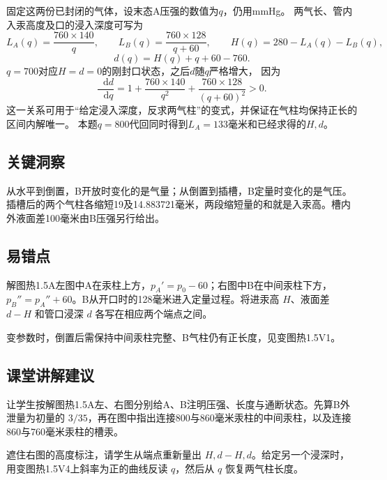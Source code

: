 \documentclass[UTF8,fontset=fandol,a4paper,11pt]{ctexart}
\newcommand{\dd}{\mathop{}\!\mathrm{d}}
\begin{document}
固定这两份已封闭的气体，设末态A压强的数值为$q$，仍用mmHg。
两气长、管内入汞高度及口的浸入深度可写为
\[
L_A(q)=\frac{760\times140}{q},\qquad
L_B(q)=\frac{760\times128}{q+60},\qquad
H(q)=280-L_A(q)-L_B(q),
\]
\[
d(q)=H(q)+q+60-760.
\]
$q=700$对应$H=d=0$的刚封口状态，之后$d$随$q$严格增大，
因为
\[
\frac{\dd d}{\dd q}
=1+\frac{760\times140}{q^2}
+\frac{760\times128}{(q+60)^2}>0.
\]
这一关系可用于“给定浸入深度，反求两气柱”的变式，并保证在气柱均保持正长的区间内解唯一。
本题$q=800$代回同时得到$L_A=133$毫米和已经求得的$H,d$。




\subsection*{关键洞察}

从水平到倒置，B开放时变化的是气量；从倒置到插槽，B定量时变化的是气压。插槽后的两个气柱各缩短19及14.883721毫米，两段缩短量的和就是入汞高。槽内外液面差100毫米由B压强另行给出。



\subsection*{易错点}

解图热1.5A左图中A在汞柱上方，$p_A'=p_0-60$；右图中B在中间汞柱下方，$p_B''=p_A''+60$。B从开口时的128毫米进入定量过程。将进汞高 $H$、液面差 $d-H$ 和管口浸深 $d$ 各写在相应两个端点之间。

变参数时，倒置后需保持中间汞柱完整、B气柱仍有正长度，见变图热1.5V1。



\subsection*{课堂讲解建议}

让学生按解图热1.5A左、右图分别给A、B注明压强、长度与通断状态。先算B外泄量为初量的 $3/35$，再在图中指出连接800与860毫米汞柱的中间汞柱，以及连接860与760毫米汞柱的槽汞。

遮住右图的高度标注，请学生从端点重新量出 $H,d-H,d$。给定另一个浸深时，用变图热1.5V4上斜率为正的曲线反读 $q$，然后从 $q$ 恢复两气柱长度。
\end{document}
